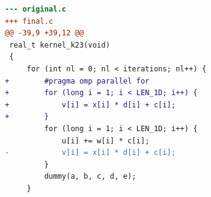 \begin{lstlisting}[language=diff,basicstyle=\ttfamily\scriptsize,breaklines=true,caption={tsvc_c2/k23 — FASTER (e2v6_agent_1)}]
--- original.c
+++ final.c
@@ -39,9 +39,12 @@
 real_t kernel_k23(void)
 {
     for (int nl = 0; nl < iterations; nl++) {
+        #pragma omp parallel for 
+        for (long i = 1; i < LEN_1D; i++) {
+            v[i] = x[i] * d[i] + c[i];
+        }
         for (long i = 1; i < LEN_1D; i++) {
             u[i] += w[i] * c[i];
-            v[i] = x[i] * d[i] + c[i];
         }
         dummy(a, b, c, d, e);
     }
\end{lstlisting}
